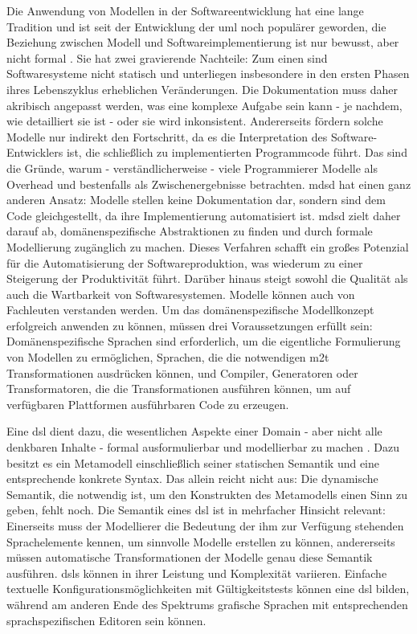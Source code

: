 Die Anwendung von Modellen in der Softwareentwicklung hat eine lange Tradition und ist seit der Entwicklung der \ac{uml} noch populärer geworden, die Beziehung zwischen Modell und Softwareimplementierung ist nur bewusst, aber nicht formal \cite[S. 3-4]{mdsd}. Sie hat zwei gravierende Nachteile: Zum einen sind Softwaresysteme nicht statisch und unterliegen insbesondere in den ersten Phasen ihres Lebenszyklus erheblichen Veränderungen. Die Dokumentation muss daher akribisch angepasst werden, was eine komplexe Aufgabe sein kann - je nachdem, wie detailliert sie ist - oder sie wird inkonsistent. Andererseits fördern solche Modelle nur indirekt den Fortschritt, da es die Interpretation des Software-Entwicklers ist, die schließlich zu implementierten Programmcode führt. Das sind die Gründe, warum - verständlicherweise - viele Programmierer Modelle als Overhead und bestenfalls als Zwischenergebnisse betrachten. \ac{mdsd} hat einen ganz anderen Ansatz: Modelle stellen keine Dokumentation dar, sondern sind dem Code gleichgestellt, da ihre Implementierung automatisiert ist. \ac{mdsd} zielt daher darauf ab, domänenspezifische Abstraktionen zu finden und durch formale Modellierung zugänglich zu machen. Dieses Verfahren schafft ein großes Potenzial für die Automatisierung der Softwareproduktion, was wiederum zu einer Steigerung der Produktivität führt. Darüber hinaus steigt sowohl die Qualität als auch die Wartbarkeit von Softwaresystemen. Modelle können auch von Fachleuten verstanden werden. Um das domänenspezifische Modellkonzept erfolgreich anwenden zu können, müssen drei Voraussetzungen erfüllt sein: Domänenspezifische Sprachen sind erforderlich, um die eigentliche Formulierung von Modellen zu ermöglichen, Sprachen, die die notwendigen \ac{m2t} Transformationen ausdrücken können, und Compiler, Generatoren oder Transformatoren, die die Transformationen ausführen können, um auf verfügbaren Plattformen ausführbaren Code zu erzeugen.

Eine \ac{dsl} dient dazu, die wesentlichen Aspekte einer Domain - aber nicht alle denkbaren Inhalte - formal ausformulierbar und modellierbar zu machen \cite[S. 58]{mdsd}. Dazu besitzt es ein Metamodell einschließlich seiner statischen Semantik und eine entsprechende konkrete Syntax. Das allein reicht nicht aus: Die dynamische Semantik, die notwendig ist, um den Konstrukten des Metamodells einen Sinn zu geben, fehlt noch. Die Semantik eines \ac{dsl} ist in mehrfacher Hinsicht relevant: Einerseits muss der Modellierer die Bedeutung der ihm zur Verfügung stehenden Sprachelemente kennen, um sinnvolle Modelle erstellen zu können, andererseits müssen automatische Transformationen der Modelle genau diese Semantik ausführen. \acp{dsl} können in ihrer Leistung und Komplexität variieren. Einfache textuelle Konfigurationsmöglichkeiten mit Gültigkeitstests können eine \ac{dsl} bilden, während am anderen Ende des Spektrums grafische Sprachen mit entsprechenden sprachspezifischen Editoren sein können.

